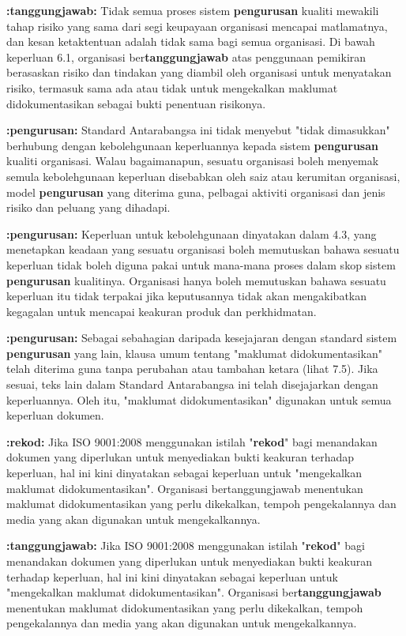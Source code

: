\documentclass{article}
\begin{document}
\textbf{:tanggungjawab:} Tidak semua proses sistem \textbf{pengurusan} kualiti mewakili tahap risiko yang sama dari segi
keupayaan organisasi mencapai matlamatnya, dan kesan ketaktentuan adalah tidak sama
bagi semua organisasi. Di bawah keperluan 6.1, organisasi ber\textbf{tanggungjawab} atas
penggunaan pemikiran berasaskan risiko dan tindakan yang diambil oleh organisasi untuk
menyatakan risiko, termasuk sama ada atau tidak untuk mengekalkan maklumat
didokumentasikan sebagai bukti penentuan risikonya.

\textbf{:pengurusan:} Standard Antarabangsa ini tidak menyebut "tidak dimasukkan" berhubung dengan
kebolehgunaan keperluannya kepada sistem \textbf{pengurusan} kualiti organisasi. Walau
bagaimanapun, sesuatu organisasi boleh menyemak semula kebolehgunaan keperluan
disebabkan oleh saiz atau kerumitan organisasi, model \textbf{pengurusan} yang diterima guna,
pelbagai aktiviti organisasi dan jenis risiko dan peluang yang dihadapi.

\textbf{:pengurusan:} Keperluan untuk kebolehgunaan dinyatakan dalam 4.3, yang menetapkan keadaan yang
sesuatu organisasi boleh memutuskan bahawa sesuatu keperluan tidak boleh diguna pakai
untuk mana-mana proses dalam skop sistem \textbf{pengurusan} kualitinya. Organisasi hanya boleh
memutuskan bahawa sesuatu keperluan itu tidak terpakai jika keputusannya tidak akan
mengakibatkan kegagalan untuk mencapai keakuran produk dan perkhidmatan.

\textbf{:pengurusan:} Sebagai sebahagian daripada kesejajaran dengan standard sistem \textbf{pengurusan} yang lain,
klausa umum tentang "maklumat didokumentasikan" telah diterima guna tanpa perubahan
atau tambahan ketara (lihat 7.5). Jika sesuai, teks lain dalam Standard Antarabangsa ini telah
disejajarkan dengan keperluannya. Oleh itu, "maklumat didokumentasikan" digunakan untuk
semua keperluan dokumen.

\textbf{:rekod:} Jika ISO 9001:2008 menggunakan istilah "\textbf{rekod}" bagi menandakan dokumen yang
diperlukan untuk menyediakan bukti keakuran terhadap keperluan, hal ini kini dinyatakan
sebagai keperluan untuk "mengekalkan maklumat didokumentasikan". Organisasi
bertanggungjawab menentukan maklumat didokumentasikan yang perlu dikekalkan, tempoh
pengekalannya dan media yang akan digunakan untuk mengekalkannya.

\textbf{:tanggungjawab:} Jika ISO 9001:2008 menggunakan istilah "\textbf{rekod}" bagi menandakan dokumen yang
diperlukan untuk menyediakan bukti keakuran terhadap keperluan, hal ini kini dinyatakan
sebagai keperluan untuk "mengekalkan maklumat didokumentasikan". Organisasi
ber\textbf{tanggungjawab} menentukan maklumat didokumentasikan yang perlu dikekalkan, tempoh
pengekalannya dan media yang akan digunakan untuk mengekalkannya.
\end{document}
